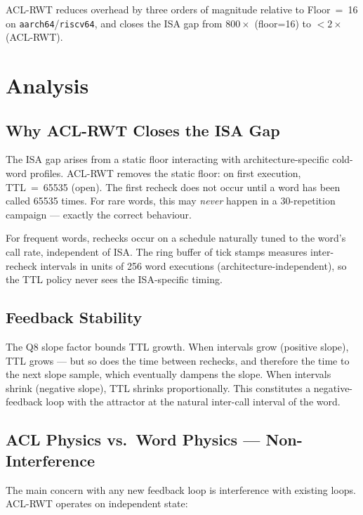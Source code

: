 \documentclass[11pt,letterpaper,openany]{article}
\begin{document}
\noindent
ACL-RWT reduces overhead by three orders of magnitude relative to
Floor~=~16 on \texttt{aarch64}/\texttt{riscv64}, and closes the ISA
gap from $800\times$ (floor=16) to $<2\times$ (ACL-RWT).

\section{Analysis}
\label{sec:analysis}

\subsection{Why ACL-RWT Closes the ISA Gap}

The ISA gap arises from a static floor interacting with
architecture-specific cold-word profiles.  ACL-RWT removes the
static floor: on first execution, TTL~=~65535 (open).  The first
recheck does not occur until a word has been called 65535 times.
For rare words, this may \emph{never} happen in a 30-repetition
campaign --- exactly the correct behaviour.

For frequent words, rechecks occur on a schedule naturally tuned to
the word's call rate, independent of ISA.  The ring buffer of tick
stamps measures inter-recheck intervals in units of 256 word
executions (architecture-independent), so the TTL policy never sees
the ISA-specific timing.

\subsection{Feedback Stability}

The Q8 slope factor bounds TTL growth.  When intervals grow
(positive slope), TTL grows --- but so does the time between rechecks,
and therefore the time to the next slope sample, which eventually
dampens the slope.  When intervals shrink (negative slope), TTL
shrinks proportionally.  This constitutes a negative-feedback loop
with the attractor at the natural inter-call interval of the word.

\subsection{ACL Physics vs.\ Word Physics — Non-Interference}

The main concern with any new feedback loop is interference with
existing loops.  ACL-RWT operates on independent state:
\end{document}
